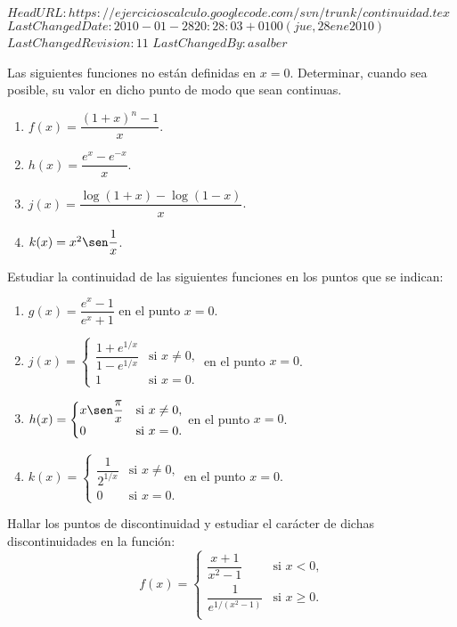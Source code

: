 \svnidlong
{$HeadURL: https://ejercicioscalculo.googlecode.com/svn/trunk/continuidad.tex $}
{$LastChangedDate: 2010-01-28 20:28:03 +0100 (jue, 28 ene 2010) $}
{$LastChangedRevision: 11 $}
{$LastChangedBy: asalber $}
%
{Las siguientes funciones no están definidas en $x=0$.
Determinar, cuando sea posible, su valor en dicho punto de modo que
sean continuas.
\begin{multicols}{2}
\begin{enumerate}
\item  $f(x)=\dfrac{(1+x)^n-1}{x}$.
\item  $h(x)=\dfrac{e^x-e^{-x}}{x}$.
\item  $j(x)=\dfrac{\log(1+x)-\log(1-x)}{x}$.
\item  $k(x)=x^2\sen\dfrac{1}{x}$.
\end{enumerate}
\end{multicols}
}


{Estudiar la continuidad de las siguientes funciones en los puntos que se indican:
\begin{enumerate}
\item  $g(x)=\dfrac{e^x-1}{e^x+1}$ \quad en el punto $x=0$.
\item  $j(x)=
\begin{cases}
\dfrac{1+e^{1/x}}{1-e^{1/x}} & \mbox{si $x\neq 0$,} \\
1 &  \mbox{si $x=0$.}
\end{cases}$
\quad
en el punto $x=0$.
\item  $h(x)=
\begin{cases}
x\sen\dfrac{\pi}{x} & \mbox{si $x\neq 0$,} \\
0 & \mbox{si $x=0$.}
\end{cases}$
\quad
en el punto $x=0$.
\item  $k(x)=
\begin{cases}
\dfrac{1}{2^{1/x}} &  \mbox{si $x\neq 0$,} \\
0 & \mbox{si $x=0$.}
\end{cases}$
\quad
en el punto $x=0$.
\end{enumerate}
}


{Hallar los puntos de discontinuidad y estudiar el carácter de dichas discontinuidades en la función:
\[
f(x)= 
\begin{cases}
\dfrac{x+1}{x^2-1} & \mbox{si $x<0$,} \\
\dfrac{1}{e^{1/(x^2-1)}} & \mbox{si $x\geq 0$.} \\
\end{cases} 
\]
}



